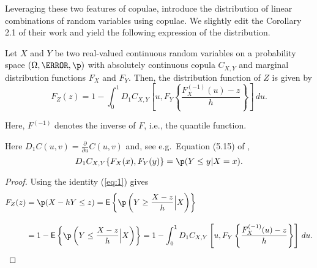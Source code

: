 Leveraging these two features of copulae, \citet{barbi2014copula}
introduce the distribution of linear combinations of random variables
using copulae. 
We slightly edit the Corollary 2.1 of their work and yield the
following expression of the distribution. 

\begin{proposition}
  \label{prop:dfrh}
  Let $X$ and $Y$ be two real-valued continuous random
  variables on a
  probability space $(\Omega, \F, \p)$ with
  absolutely continuous copula $C_{X, Y}$ and marginal distribution functions $F_{X}$
  and $F_{Y}$. Then, the distribution function of $Z$ is given by 
  \begin{equation}
    \label{eq:3}
    F_{Z}(z) = 1- \int^1_0 D_1 C_{X, Y}
    \left[ u, F_{Y} \left\{ \frac{F^{(-1)}_{X}(u)-z}{h} \right\}
    \right]\, d u.
  \end{equation}
\end{proposition}
Here, $F^{(-1)}$ denotes the inverse of $F$, i.e., the quantile
function. \medskip

Here $D_1 C(u,v)=\displaystyle \frac{\partial}{\partial u} C(u,v)$ and, see e.g.\ Equation (5.15) of
\citep{McNeil2005},
\begin{equation}
  \label{eq:1}
  D_1 C_{X,Y}\{F_X(x), F_Y(y)\} = \p(Y\leq y|X=x).
\end{equation}
\begin{proof}
  
  Using the identity (\ref{eq:1}) gives
  \begin{align*}
    F_{Z}(z) &= \p(X - h Y\leq z) %
                 = \mbox{\sf E}\left\{\p\left(Y\geq \frac{X-z}{h}\Big|
                 X\right)\right\}\\[10pt]
               &= 1-\mbox{\sf E}\left\{\p\left(Y\leq \frac{X-z}{h}\Big|
                 X\right)\right\}%
               = 1- \int_0^1 D_1 C_{X, Y}\left[u,
                 F_{Y}\left\{\frac{F^{(-1)}_{X}(u) -
                 z}{h}\right\}\right]\, d u.
  \end{align*}
  \end{proof}


